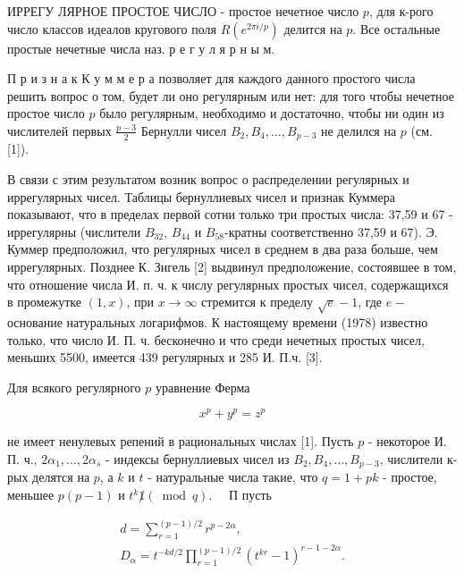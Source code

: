 \documentclass[10pt]{article}
\begin{document}
ИРРЕГУ ЛЯРНОЕ ПРОСТОЕ ЧИСЛО - простое нечетное число $p$, для к-рого число классов идеалов кругового поля $R\left(e^{2 \pi i / p}\right)$ делится на $p$. Все остальные простые нечетные числа наз. р е г у л я р н ы м.



П р и з н а к К у м м е р а позволяет для каждого данного простого числа решить вопрос о том, будет ли оно регулярным или нет: для того чтобы нечетное простое число $p$ было регулярным, необходимо и достаточно, чтобы ни один из числителей первых $\frac{p-3}{2}$ Бернулли чисел $B_{2}, B_{4}, \ldots, B_{p-3}$ не делился на $p$ (см. [1]).



В связи с этим результатом возник вопрос о распределении регулярных и иррегулярных чисел. Таблицы бернуллиевых чисел и признак Куммера показывают, что в пределах первой сотни только три простых числа: 37,59 и 67 - иррегулярны (числители $B_{32}$, $B_{44}$ и $B_{58}$-кратны соответственно 37,59 и 67). Э. Куммер предположил, что регулярных чисел в среднем в два раза больше, чем иррегулярных. Позднее К. Зигель [2] выдвинул предположение, состоявшее в том, что отношение числа И. п. ч. к числу регулярных простых чисел, содержащихся в промежутке $(1, x)$, при $x \rightarrow \infty$ стремится к пределу $\sqrt{e}-1$, где $e-$ основание натуральных логарифмов. К настоящему времени (1978) известно только, что число И. П. ч. бесконечно и что среди нечетных простых чисел, меньших 5500, имеется 439 регулярных и 285 И. П.ч. [3].



Для всякого регулярного $p$ уравнение Ферма



\[

x^{p}+y^{p}=z^{p}

\]



не имеет ненулевых репений в рациональных числах [1]. Пусть $p$ - некоторое И. П. ч., $2 \alpha_{1}, \ldots, 2 \alpha_{s}$ - индексы бернуллиевых чисел из $B_{2}, B_{4}, \ldots, B_{p-3}$, числители к-рых делятся на $p$, а $k$ и $t$ - натуральные числа такие, что $q=1+p k$ - простое, меньшее $p(p-1)$ и $t^{k} \not 1(\bmod q) . \quad$ П пусть



\[

\begin{gathered}

d=\sum_{r=1}^{(p-1) / 2} r^{p-2 \alpha}, \\

D_{\alpha}=t^{-k d / 2} \prod_{r=1}^{(p-1) / 2}\left(t^{k r}-1\right)^{r-1-2 \alpha} .

\end{gathered}

\]
\end{document}
